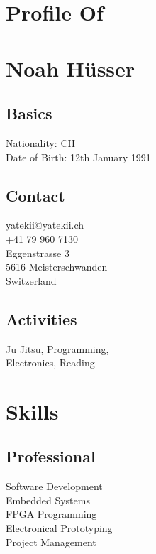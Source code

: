 \documentclass[]{resume}
\begin{document}

\begin{facts}
\section{Profile Of}
\section{Noah Hüsser}
\sectionsep

\subsection{Basics}
Nationality: CH\\
Date of Birth: 12th January 1991
\sectionsep

\subsection{Contact}
yatekii@yatekii.ch\\
+41 79 960 7130\\
\sectionsep
Eggenstrasse 3\\
5616 Meisterschwanden\\
Switzerland
\sectionsep

\subsection{Activities}
Ju Jitsu, Programming,\\
Electronics, Reading
\sectionsep


\section{Skills}

\subsection{Professional}
Software Development\\
Embedded Systems\\
FPGA Programming\\
Electronical Prototyping\\
Project Management
\sectionsep


\end{facts}
\end{document}
